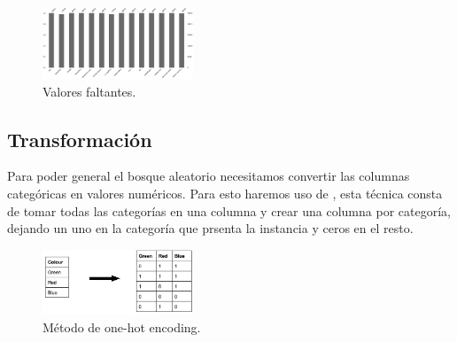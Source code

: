 \documentclass[twocolumn]{article}
\begin{document}
\begin{figure}[!h]
\centering
\includegraphics[width=0.4\textwidth]{assets/missing.png}
\caption{\label{fig:missing}Valores faltantes.}
\end{figure}

\subsection{Transformación}
Para poder general el bosque aleatorio necesitamos convertir las columnas categóricas
en valores numéricos. Para esto haremos uso de , esta técnica
consta de tomar todas las categorías en una columna y crear una columna por categoría, 
dejando un uno en la categoría que prsenta la instancia y ceros en el resto.

\begin{figure}[!h]
\centering
\includegraphics[width=0.4\textwidth]{assets/onehot.png}
\caption{\label{fig:onehot}Método de one-hot encoding.}
\end{figure}
\end{document}
